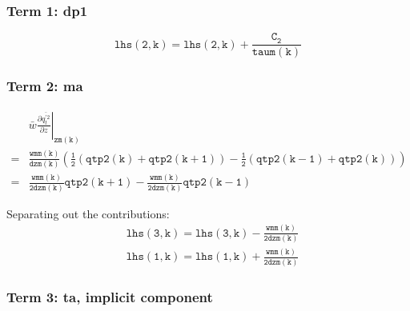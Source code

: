 \documentclass[11pt,fleqn]{article}
\newcommand{\ptlder}[2]{\frac{\partial #1}{\partial #2}}
\begin{document}
\subsubsection{Term 1:  dp1}

\begin{equation}
\mathtt{ lhs(2,k) = lhs(2,k) + \frac{C_2}{taum(k)} }
\end{equation}

\subsubsection{Term 2:  ma}

\begin{equation}
\begin{split}
& \left. \bar{w}\ptlder{\overline{q^{'2}_t}}{z} \right|_{\mathtt{zm(k)}} \\
=& \mathtt{ \frac{wmm(k)}{dzm(k)}
   \left(
     \frac{1}{2} \left( qtp2(k)+qtp2(k+1) \right)
     - \frac{1}{2} \left( qtp2(k-1)+qtp2(k) \right)
   \right) } \\
=& \mathtt{ \frac{wmm(k)}{2 dzm(k)} qtp2(k+1) - \frac{wmm(k)}{2 dzm(k)} qtp2(k-1) }
\end{split}
\end{equation}

Separating out the contributions:
%
\begin{equation}
\begin{split}
& \mathtt{ lhs(3,k) = lhs(3,k) - \frac{wmm(k)}{2 dzm(k)} } \\
& \mathtt{ lhs(1,k) = lhs(1,k) + \frac{wmm(k)}{2 dzm(k)} }
\end{split}
\end{equation}

\subsubsection{Term 3:  ta, implicit component}
\end{document}
